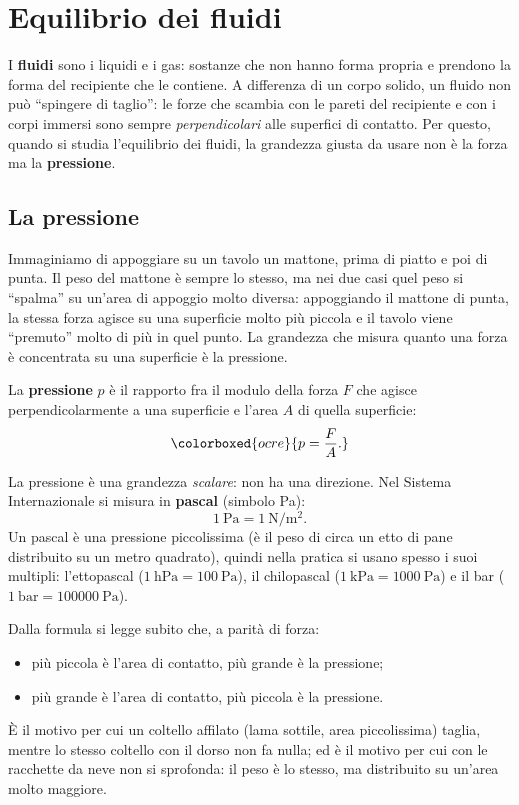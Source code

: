 \chapter{Equilibrio dei fluidi}

I \textbf{fluidi} sono i liquidi e i gas: sostanze che non hanno forma propria e prendono la forma del recipiente che le contiene. A differenza di un corpo solido, un fluido non può ``spingere di taglio'': le forze che scambia con le pareti del recipiente e con i corpi immersi sono sempre \emph{perpendicolari} alle superfici di contatto. Per questo, quando si studia l'equilibrio dei fluidi, la grandezza giusta da usare non è la forza ma la \textbf{pressione}.

\section{La pressione}

Immaginiamo di appoggiare su un tavolo un mattone, prima di piatto e poi di punta. Il peso del mattone è sempre lo stesso, ma nei due casi quel peso si ``spalma'' su un'area di appoggio molto diversa: appoggiando il mattone di punta, la stessa forza agisce su una superficie molto più piccola e il tavolo viene ``premuto'' molto di più in quel punto. La grandezza che misura quanto una forza è concentrata su una superficie è la pressione.

\begin{definizione}
La \textbf{pressione} $p$ è il rapporto fra il modulo della forza $F$ che agisce perpendicolarmente a una superficie e l'area $A$ di quella superficie:
\[ \colorboxed{ocre}{ p = \frac{F}{A}. } \]
\end{definizione}

La pressione è una grandezza \emph{scalare}: non ha una direzione. Nel Sistema Internazionale si misura in \textbf{pascal} (simbolo \si{\pascal}):
\[ \SI{1}{\pascal} = \SI{1}{\newton\per\metre\squared}. \]
Un pascal è una pressione piccolissima (è il peso di circa un etto di pane distribuito su un metro quadrato), quindi nella pratica si usano spesso i suoi multipli: l'ettopascal ($\SI{1}{\hecto\pascal}=\SI{100}{\pascal}$), il chilopascal ($\SI{1}{\kilo\pascal}=\SI{1000}{\pascal}$) e il bar ($\SI{1}{\bar}=\SI{100000}{\pascal}$).

Dalla formula si legge subito che, a parità di forza:
\begin{itemize}
    \item più piccola è l'area di contatto, più grande è la pressione;
    \item più grande è l'area di contatto, più piccola è la pressione.
\end{itemize}
È il motivo per cui un coltello affilato (lama sottile, area piccolissima) taglia, mentre lo stesso coltello con il dorso non fa nulla; ed è il motivo per cui con le racchette da neve non si sprofonda: il peso è lo stesso, ma distribuito su un'area molto maggiore.

